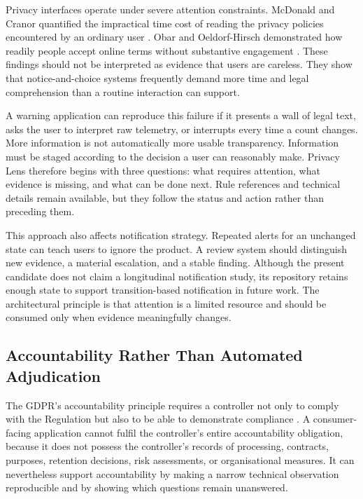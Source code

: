 Privacy interfaces operate under severe attention constraints. McDonald and Cranor quantified the impractical time cost of reading the privacy policies encountered by an ordinary user \cite{12}. Obar and Oeldorf-Hirsch demonstrated how readily people accept online terms without substantive engagement \cite{13}. These findings should not be interpreted as evidence that users are careless. They show that notice-and-choice systems frequently demand more time and legal comprehension than a routine interaction can support.

A warning application can reproduce this failure if it presents a wall of legal text, asks the user to interpret raw telemetry, or interrupts every time a count changes. More information is not automatically more usable transparency. Information must be staged according to the decision a user can reasonably make. Privacy Lens therefore begins with three questions: what requires attention, what evidence is missing, and what can be done next. Rule references and technical details remain available, but they follow the status and action rather than preceding them.

This approach also affects notification strategy. Repeated alerts for an unchanged state can teach users to ignore the product. A review system should distinguish new evidence, a material escalation, and a stable finding. Although the present candidate does not claim a longitudinal notification study, its repository retains enough state to support transition-based notification in future work. The architectural principle is that attention is a limited resource and should be consumed only when evidence meaningfully changes.

\subsection{Accountability Rather Than Automated Adjudication}

The GDPR's accountability principle requires a controller not only to comply with the Regulation but also to be able to demonstrate compliance \cite{eurlex2016}. A consumer-facing application cannot fulfil the controller's entire accountability obligation, because it does not possess the controller's records of processing, contracts, purposes, retention decisions, risk assessments, or organisational measures. It can nevertheless support accountability by making a narrow technical observation reproducible and by showing which questions remain unanswered.

